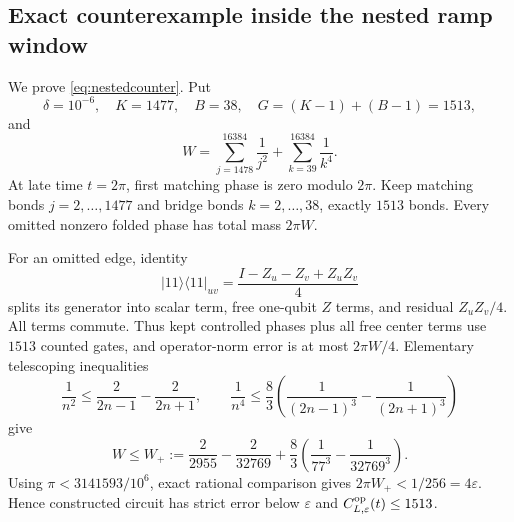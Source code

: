 \subsection{Exact counterexample inside the nested ramp window}

We prove \eqref{eq:nestedcounter}.  Put
\[
 \delta=10^{-6},\quad K=1477,\quad B=38,\quad
 G=(K-1)+(B-1)=1513,
\]
and
\begin{equation}
 W=\sum_{j=1478}^{16384}\frac1{j^2}
   +\sum_{k=39}^{16384}\frac1{k^4}.                 \label{eq:counterW}
\end{equation}
At late time $t=2\pi$, first matching phase is zero modulo $2\pi$.  Keep
matching bonds $j=2,\ldots,1477$ and bridge bonds $k=2,\ldots,38$, exactly
$1513$ bonds.  Every omitted nonzero folded phase has total mass $2\pi W$.

For an omitted edge, identity
\[
 |11\rangle\!\langle11|_{uv}
 =\frac{I-Z_u-Z_v+Z_uZ_v}{4}
\]
splits its generator into scalar term, free one-qubit $Z$ terms, and residual
$Z_uZ_v/4$.  All terms commute.  Thus kept controlled phases plus all free
center terms use $1513$ counted gates, and operator-norm error is at most
$2\pi W/4$.  Elementary telescoping inequalities
\[
 \frac1{n^2}\le\frac2{2n-1}-\frac2{2n+1},\qquad
 \frac1{n^4}\le\frac83\left(\frac1{(2n-1)^3}-
   \frac1{(2n+1)^3}\right)
\]
give
\begin{equation}
 W\le W_+:=\frac2{2955}-\frac2{32769}
 +\frac83\left(\frac1{77^3}-\frac1{32769^3}\right). \label{eq:counterWplus}
\end{equation}
Using $\pi<3141593/10^6$, exact rational comparison gives
$2\pi W_+<1/256=4\varepsilon$.  Hence constructed circuit has strict error
below $\varepsilon$ and
$C^{\rm op}_{L,\varepsilon}(t)\le1513$.

